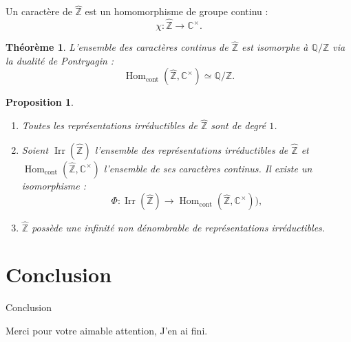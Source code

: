 \documentclass[9pt]{beamer}
\newtheorem{proposition}{Proposition}
\newtheorem{theoreme}{Théorème}
\begin{document}
\begin{frame}
\begin{definition}
	Un caractère de $\widehat{\mathbb{Z}}$ est un homomorphisme de groupe continu :
	\[
	\chi : \widehat{\mathbb{Z}} \to \mathbb{C}^\times.
	\]
	
\end{definition}

\begin{theoreme}
	L'ensemble des caractères continus de $\widehat{\mathbb{Z}}$ est isomorphe à $\mathbb{Q}/\mathbb{Z}$ via la dualité de Pontryagin :
	\[
	\operatorname{Hom}_{\text{cont}}(\widehat{\mathbb{Z}}, \mathbb{C}^\times) \simeq \mathbb{Q}/\mathbb{Z}.
	\]
\end{theoreme}


\begin{proposition}
	\begin{enumerate} [label=\roman*)] 
		\item Toutes les représentations irréductibles de $\widehat{\mathbb{Z}}$ sont de degré $1$.
		\item Soient $\operatorname{Irr}(\widehat{\mathbb{Z}})$ l'ensemble des représentations irréductibles de $\widehat{\mathbb{Z}}$ et $\operatorname{Hom}_{\text{cont}}(\widehat{\mathbb{Z}}, \mathbb{C}^\times)$ l'ensemble de ses caractères continus. Il existe un isomorphisme :
		\[
		\Phi : \operatorname{Irr}(\widehat{\mathbb{Z}}) \to \operatorname{Hom}_{\text{cont}}(\widehat{\mathbb{Z}}, \mathbb{C}^\times)),
		\]
		\item $\widehat{\mathbb{Z}}$ possède une infinité non dénombrable de représentations irréductibles.
	\end{enumerate}
\end{proposition}

\end{frame}

	\section{Conclusion}
	\begin{frame}{Conclusion}
	
	Merci pour votre aimable attention, J'en ai fini.
	\end{frame}
	
	
\end{document}
